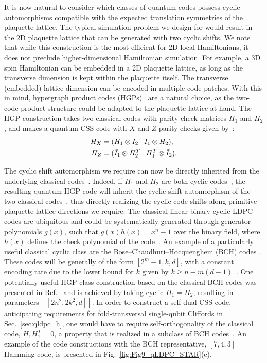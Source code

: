 \documentclass[aps, prx, reprint, superscriptaddress, longbibliography, floatfix]{revtex4-2}
\begin{document}
It is now natural to consider which classes of quantum codes possess cyclic automorphisms compatible with the expected translation symmetries of the plaquette lattice. The typical simulation problem we design for would result in the 2D plaquette lattice that can be generated with two cyclic shifts. We note that while this construction is the most efficient for 2D local Hamiltonians, it does not preclude higher-dimensional Hamiltonian simulation. For example, a 3D spin Hamiltonian can be embedded in a 2D plaquette lattice, as long as the transverse dimension is kept within the plaquette itself. The transverse (embedded) lattice dimension can be encoded in multiple code patches. With this in mind, hypergraph product codes (HGPs)~\cite{Tillich2014} are a natural choice, as the two-code product structure could be adapted to the plaquette lattice at hand. The HGP construction takes two classical codes with parity check matrices $H_1$ and $H_2$, and makes a quantum CSS code with $X$ and $Z$ parity checks given by~\cite{Tillich2014, Kovalev2013}:
\begin{align}\label{eq:HGP}
    H_X&=(H_1\otimes I_2 \hspace{8pt} I_1\otimes H_2), \\ H_Z&=(\tilde{I}_1\otimes H_2^T \hspace{8pt} H_1^T\otimes \tilde{I}_2).\notag
\end{align}

The cyclic shift automorphism we require can now be directly inherited from the underlying classical codes~\cite{Kovalev2013}. Indeed, if $H_1$ and $H_2$ are both cyclic codes~\cite{Macwilliams1977, berthusen2025}, the resulting quantum HGP code will inherit the cyclic shift automorphism of the two classical codes~\cite{Xu2025}, thus directly realizing the cyclic code shifts along primitive plaquette lattice directions we require. The classical linear binary cyclic LDPC codes are ubiquitous and could be systematically generated through generator polynomials $g(x)$, such that $g(x)h(x)=x^n-1$ over the binary field, where $h(x)$ defines the check polynomial of the code~\cite{Macwilliams1977, Kovalev2013}. An example of a particularly useful classical cyclic class are the Bose–Chaudhuri–Hocquenghem (BCH) codes~\cite{bose1960class, hocquenghem1959codes}. These codes will be generally of the form $[2^m-1, k, d]$, with a constant encoding rate due to the lower bound for $k$ given by $k\geq n-m (d-1)$~\cite{Macwilliams1977}. One potentially useful HGP class construction based on the classical BCH codes was presented in Ref.~\cite{Kovalev2012, Kovalev2013} and is achieved by taking cyclic $H_1=H_2$, resulting in parameters $[[2n^2, 2k^2, d]]$. In order to construct a self-dual CSS code, anticipating requirements for fold-transversal single-qubit Cliffords in Sec.~\ref{sec:qldpc_h}, one would have to require self-orthogonality of the classical code, $H_1H_1^T=0$, a property that is realized in a subclass of BCH codes~\cite{Macwilliams1977}. An example of the code constructions with the BCH representative, $[7,4,3]$ Hamming code, is presented in Fig.~\ref{fig:Fig9_qLDPC_STAR}(c). 
\end{document}
